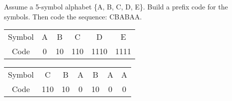 \begin{question}
Assume a 5-symbol alphabet \{A, B, C, D, E\}. Build a prefix code for the symbols. Then code the sequence: CBABAA.
\end{question}
\begin{solution}
\begin{table}[h]
\renewcommand{\arraystretch}{1.3}
\centering
\begin{tabular}{c|c|c|c|c|c}
\hline
Symbol & A & B & C & D & E \\
Code & 0 & 10 & 110 & 1110 & 1111 \\
\hline
\end{tabular}
\end{table}

\begin{table}[h]
\renewcommand{\arraystretch}{1.3}
\centering
\begin{tabular}{c|c|c|c|c|c|c}
\hline
Symbol & C & B & A & B & A & A \\
Code & 110 & 10 & 0 & 10 & 0 & 0 \\
\hline
\end{tabular}
\end{table}

\end{solution}


